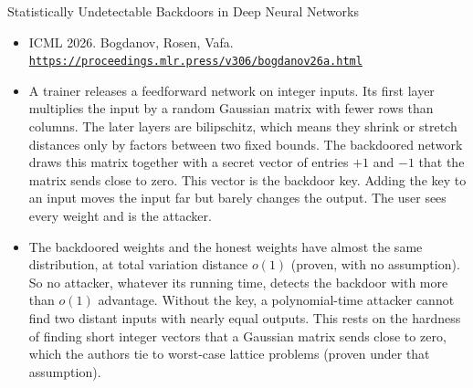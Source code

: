 \documentclass[aspectratio=169,10pt]{beamer}
\newcommand{\venue}[3]{\item #1. #2.\\ \href{#3}{\nolinkurl{#3}}}
\begin{document}
\begin{frame}{Statistically Undetectable Backdoors in Deep Neural Networks}
  \begin{itemize}
    \venue{ICML 2026}{Bogdanov, Rosen, Vafa}{https://proceedings.mlr.press/v306/bogdanov26a.html}
    \item A trainer releases a feedforward network on integer inputs. Its first layer multiplies the input by a random Gaussian matrix with fewer rows than columns. The later layers are bilipschitz, which means they shrink or stretch distances only by factors between two fixed bounds. The backdoored network draws this matrix together with a secret vector of entries $+1$ and $-1$ that the matrix sends close to zero. This vector is the backdoor key. Adding the key to an input moves the input far but barely changes the output. The user sees every weight and is the attacker.
    \item The backdoored weights and the honest weights have almost the same distribution, at total variation distance $o(1)$ (proven, with no assumption). So no attacker, whatever its running time, detects the backdoor with more than $o(1)$ advantage. Without the key, a polynomial-time attacker cannot find two distant inputs with nearly equal outputs. This rests on the hardness of finding short integer vectors that a Gaussian matrix sends close to zero, which the authors tie to worst-case lattice problems (proven under that assumption).
  \end{itemize}
\end{frame}
\end{document}
